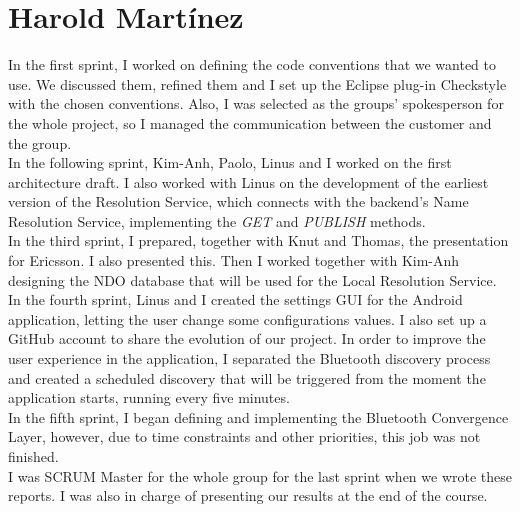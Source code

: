 \section{Harold Martínez}

In the first sprint, I worked on defining the code conventions that we wanted to use. 
We discussed them, refined them and I set up the Eclipse plug-in Checkstyle with the chosen conventions.
Also, I was selected as the groups' spokesperson for the whole project, so I managed the communication 
between the customer and the group.\\

In the following sprint, Kim-Anh, Paolo, Linus and I worked on the first architecture draft.
I also worked with Linus on the development of the earliest version of the Resolution Service, which connects with the 
backend's Name Resolution Service, implementing the \emph{GET} and \emph{PUBLISH} methods.\\

In the third sprint, I prepared, together with Knut and Thomas, the presentation for Ericsson. I also presented this. 
Then I worked together with Kim-Anh designing the NDO database that will be used for the 
Local Resolution Service.\\

In the fourth sprint, Linus and I created the settings GUI for the Android application, letting the user change 
some configurations values. I also set up a GitHub account to share the evolution of our project. In order to improve 
the user experience in the application, I separated the Bluetooth discovery process and created a scheduled discovery that 
will be triggered from the moment the application starts, running every five minutes.\\

In the fifth sprint, I began defining and implementing the Bluetooth Convergence Layer, however, due to time constraints 
and other priorities, this job was not finished. \\

I was SCRUM Master for the whole group for the last sprint when we wrote these reports. I was also in charge of presenting 
our results at the end of the course.\\

